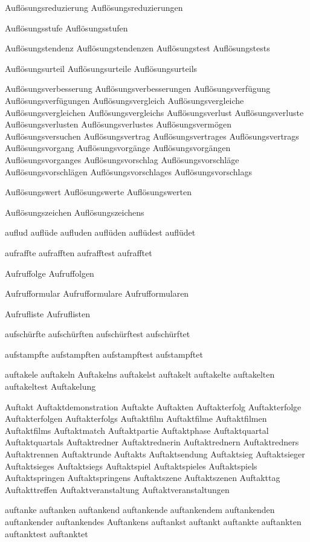 Auflösungsreduzierung
Auflösungsreduzierungen

Auflösungsstufe
Auflösungsstufen

Auflösungstendenz
Auflösungstendenzen
Auflösungstest
Auflösungstests

Auflösungsurteil
Auflösungsurteile
Auflösungsurteils

Auflösungsverbesserung
Auflösungsverbesserungen
Auflösungsverfügung
Auflösungsverfügungen
Auflösungsvergleich
Auflösungsvergleiche
Auflösungsvergleichen
Auflösungsvergleichs
Auflösungsverlust
Auflösungsverluste
Auflösungsverlusten
Auflösungsverlustes
Auflösungsvermögen
Auflösungsversuchen
Auflösungsvertrag
Auflösungsvertrages
Auflösungsvertrags
Auflösungsvorgang
Auflösungsvorgänge
Auflösungsvorgängen
Auflösungsvorganges
Auflösungsvorschlag
Auflösungsvorschläge
Auflösungsvorschlägen
Auflösungsvorschlages
Auflösungsvorschlags

Auflösungswert
Auflösungswerte
Auflösungswerten

Auflösungszeichen
Auflösungszeichens

auflud
auflüde
aufluden
auflüden
auflüdest
auflüdet

aufraffte
aufrafften
aufrafftest
aufrafftet

Aufruffolge
Aufruffolgen

Aufrufformular
Aufrufformulare
Aufrufformularen

Aufrufliste
Aufruflisten

aufschürfte
aufschürften
aufschürftest
aufschürftet

aufstampfte
aufstampften
aufstampftest
aufstampftet

auftakele
auftakeln
Auftakelns
auftakelst
auftakelt
auftakelte
auftakelten
auftakeltest
Auftakelung

Auftakt
Auftaktdemonstration
Auftakte
Auftakten
Auftakterfolg
Auftakterfolge
Auftakterfolgen
Auftakterfolgs
Auftaktfilm
Auftaktfilme
Auftaktfilmen
Auftaktfilms
Auftaktmatch
Auftaktpartie
Auftaktphase
Auftaktquartal
Auftaktquartals
Auftaktredner
Auftaktrednerin
Auftaktrednern
Auftaktredners
Auftaktrennen
Auftaktrunde
Auftakts
Auftaktsendung
Auftaktsieg
Auftaktsieger
Auftaktsieges
Auftaktsiegs
Auftaktspiel
Auftaktspieles
Auftaktspiels
Auftaktspringen
Auftaktspringens
Auftaktszene
Auftaktszenen
Auftakttag
Auftakttreffen
Auftaktveranstaltung
Auftaktveranstaltungen

auftanke
auftanken
auftankend
auftankende
auftankendem
auftankenden
auftankender
auftankendes
Auftankens
auftankst
auftankt
auftankte
auftankten
auftanktest
auftanktet

